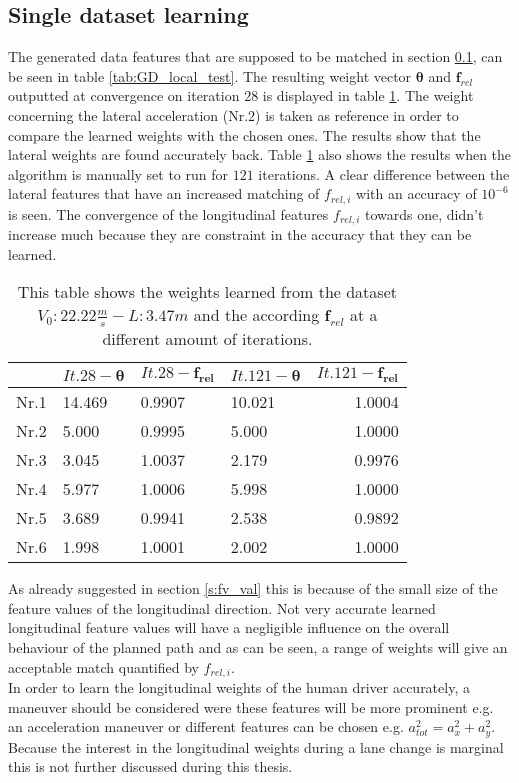 \subsection{Single dataset learning}\label{s:SDL}
The generated data features that are supposed to be matched in section \ref{s:SDL}, can be seen in table \ref{tab:GD_local_test}.
The resulting weight vector $\bm{\theta}$ and $\bm{f}_{rel}$ outputted at convergence on iteration $28$ is displayed in table \ref{tab:comp_it}. The weight concerning the lateral acceleration (Nr.$2$) is taken as reference in order to compare the learned weights with the chosen ones. The results show that the lateral weights are found accurately back. Table \ref{tab:comp_it} also shows the results when the algorithm is manually set to run for $121$ iterations.
A clear difference between the lateral features that have an increased matching of $f_{rel,i}$ with an accuracy of $10^{-6}$ is seen. The convergence of the longitudinal features $f_{rel,i}$ towards one, didn't increase much because they are constraint in the accuracy that they can be learned. 

\begin{table}[h!]
	\centering
	\begin{tabular}{@{}llllr@{}} \toprule
					      & $It.28-\bm{\theta}$ & $It.28-\bm{f_{rel}}$ & $It.121- \bm{\theta}$ & $It.121-\bm{f_{rel}}$\\ \midrule
		Nr.1       		  &14.469        & 0.9907 	    & 10.021 &	1.0004	\\
		Nr.2              &5.000       & 0.9995       & 5.000 &   1.0000   \\
		Nr.3              & 3.045       & 1.0037       & 2.179 &  0.9976    \\
		Nr.4              & 5.977       & 1.0006       & 5.998 & 1.0000     \\
		Nr.5              & 3.689       & 0.9941       & 2.538 &   0.9892   \\
		Nr.6              & 1.998       & 1.0001       & 2.002 &  1.0000    \\ \bottomrule
	\end{tabular}
	\caption{This table shows the weights learned from the dataset $V_0:22.22\frac{m}{s}-L:3.47m$ and the according $\bm{f}_{rel}$ at a different amount of iterations.}
	\label{tab:comp_it}
\end{table} 

 As already suggested in section \ref{s:fv_val} this is because of the small size of the feature values of the longitudinal direction. Not very accurate learned longitudinal feature values will have a negligible influence on the overall behaviour of the planned path and as can be seen, a range of weights will give an acceptable match quantified by $f_{rel,i}$.\\
 In order to learn the longitudinal weights of the human driver accurately, a maneuver should be considered were these features will be more prominent e.g. an acceleration maneuver or different features can be chosen e.g. $a_{tot}^2 = a_x^2 + a_y^2$. Because the interest in the longitudinal weights during a lane change is marginal this is not further discussed during this thesis.\\          

